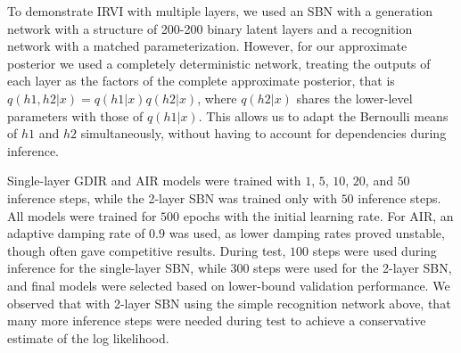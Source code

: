 \documentclass{article} %
\begin{document}
To demonstrate IRVI with multiple layers, we used an SBN with a generation network with a structure of 200-200 binary latent layers and a recognition network with a matched parameterization. However, for our approximate posterior we used a completely deterministic network, treating the outputs of each layer as the factors of the complete approximate posterior, that is $q(h1, h2 | x) = q(h1|x) q(h2|x)$, where $q(h2|x)$ shares the lower-level parameters with those of $q(h1|x)$. This allows us to adapt the Bernoulli means of $h1$ and $h2$ simultaneously, without having to account for dependencies during inference.

Single-layer GDIR and AIR models were trained with $1$, $5$, $10$, $20$, and $50$ inference steps, while the 2-layer SBN was trained only with $50$ inference steps. All
models were trained for $500$ epochs with the initial learning rate. For AIR, an
adaptive damping rate of $0.9$ was used, as lower damping rates proved unstable, though often gave competitive results.
During test, $100$ steps were used during inference for the single-layer SBN, while $300$ steps were used for the 2-layer SBN, and final models were selected
based on lower-bound validation performance. We observed that with 2-layer SBN using the simple recognition network above, that many more inference steps were needed during test to achieve a conservative estimate of the log likelihood.
\end{document}
